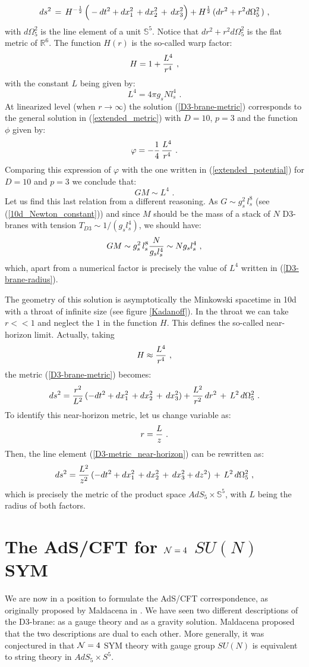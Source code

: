 \documentclass[12pt,notitlepage,a4paper]{article}
\newcommand{\beq}{\begin{equation}}
\newcommand{\eeq}{\end{equation}}
\begin{document}
\beq
ds^2\,=\,H^{-{1\over 2}}\,
\Big(-dt^2+dx_1^2\,+dx_2^2\,+\, dx_{3}^2\Big)+
H^{{1\over 2}}\,(dr^2+r^2 d\Omega_5^2\,)\,\,,
\label{D3-brane-metric}
\eeq
with $d\Omega_5^2$ is the  line element of a unit ${\mathbb S}^5$. Notice that   $dr^2+r^2 d\Omega_5^2$ is the  flat metric of ${\mathbb R}^6$.  The function $H(r)$  is the so-called warp factor:
\beq
H=1+{L^4\over r^4}\,\,,
\eeq
with the constant $L$ being given by:
\beq
L^4= 4\pi g_s N l_s^4\,\,.
\label{D3-brane-radius}
\eeq
At linearized level (when $r\to\infty$) the solution (\ref{D3-brane-metric})
corresponds to the general solution in (\ref{extended_metric}) with $D=10$, $p=3$ and the function $\phi$ given by: 
\beq
\varphi=-{1\over 4}\,{L^4\over r^4}\,\,.
\eeq
Comparing this expression of $\varphi$ with the one written in (\ref{extended_potential}) for $D=10$ and  $p=3$ we conclude that:
\beq
GM\sim L^4\,\,.
\eeq
Let us find  this last relation from a different reasoning. 
As  $G\sim g_s^2\,l_s^8$ (see (\ref{10d_Newton_constant})) and  since $M$ should be the mass of a stack of $N$ D3-branes with tension $T_{D3}\sim 1/(g_s l_s^4)$, we should have:
\beq
GM\sim  g_s^2\,l_s^8 {N\over g_s l_s^4}\sim N g_s l_s^4\,\,,
\eeq
which, apart from a numerical factor is precisely the value of $L^4$ written in (\ref{D3-brane-radius}). 


The geometry of this solution is asymptotically the Minkowski spacetime in 10d with a throat of infinite size (see figure \ref{Kadanoff}). In the throat we can take $r<<1$ and neglect the $1$ in the function $H$. This defines the so-called near-horizon limit. Actually, taking
\beq
H\approx {L^4\over r^4}\,\,,
\eeq
the metric (\ref{D3-brane-metric})  becomes:
\beq
ds^2={r^2\over L^2}\,(-dt^2+dx_1^2\,+dx_2^2\,+\, dx_{3}^2)+{L^2\over r^2}\,dr^2\,+\,L^2\,
d\Omega_5^2\,\,.
\label{D3-metric_near-horizon}
\eeq
To identify this near-horizon metric, let us change variable as:
\beq
r={L\over z}\,\,.
\eeq
Then, the line element (\ref{D3-metric_near-horizon}) can be rewritten as:
\beq
ds^2={L^2\over z^2}\,(-dt^2+dx_1^2\,+dx_2^2\,+\, dx_{3}^2+dz^2)
\,+\,L^2\,
d\Omega_5^2\,\,,
\eeq
which  is precisely  the metric of the product space $AdS_5\times {\mathbb S}^5$,  with $L$ being the radius of both factors.


\section{The AdS/CFT for ${\cal N}=4$ $SU(N)$ SYM}

We are now in a position to formulate the AdS/CFT correspondence, as originally  proposed by Maldacena in  \cite{Maldacena:1997re}. We have seen two different descriptions of the D3-brane: as a gauge theory and as a gravity solution.  Maldacena proposed that the two descriptions are dual to each other. More generally, it was conjectured in \cite{Maldacena:1997re} that 
${\cal N}=4$  SYM theory with gauge group $SU(N)$  is equivalent to  string theory in  $AdS_5\times S^5$. 
\end{document}
